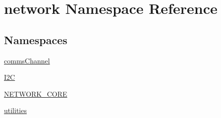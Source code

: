 \hypertarget{namespacenetwork}{}\section{network Namespace Reference}
\label{namespacenetwork}
\subsection*{Namespaces}
\begin{DoxyCompactItemize}
\item 
 \hyperlink{namespacenetwork_1_1commsChannel}{comms\+Channel}
\item 
 \hyperlink{namespacenetwork_1_1I2C}{I2\+C}
\item 
 \hyperlink{namespacenetwork_1_1NETWORK__CORE}{N\+E\+T\+W\+O\+R\+K\+\_\+\+C\+O\+R\+E}
\item 
 \hyperlink{namespacenetwork_1_1utilities}{utilities}
\end{DoxyCompactItemize}
